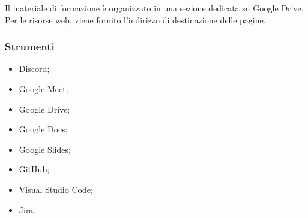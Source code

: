 \vspace{0.5\baselineskip}
\par Il materiale di formazione è organizzato in una sezione dedicata su Google Drive. Per le risorse web, viene fornito l'indirizzo di destinazione delle pagine.

\subsubsection{Strumenti}
\IntroStrumenti
\begin{itemize}
  \item Discord;
  \item Google Meet;
  \item Google Drive;
  \item Google Docs;
  \item Google Slides;
  \item GitHub;
  \item Visual Studio Code;
  \item Jira.
\end{itemize}